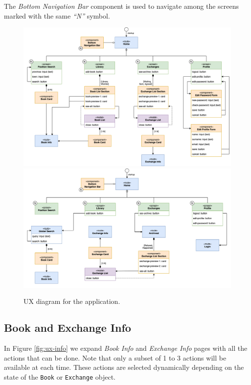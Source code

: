 The \emph{Bottom Navigation Bar} component is used to navigate among the screens marked with the same \emph{``N''} symbol.

\begin{figure}[H]
      \includegraphics{ux-diagram/ux-part-1.png}
      \includegraphics{ux-diagram/ux-part-2.png}
      \caption{UX diagram for the application.}
      \label{fig:ux-main}
\end{figure}

\subsection{Book and Exchange Info}
In Figure \ref{fig:ux-info} we expand \emph{Book Info} and \emph{Exchange Info} pages with all the actions that can be done.
Note that only a subset of 1 to 3 actions will be available at each time.
These actions are selected dynamically depending on the state of the \texttt{Book} or \texttt{Exchange} object.

